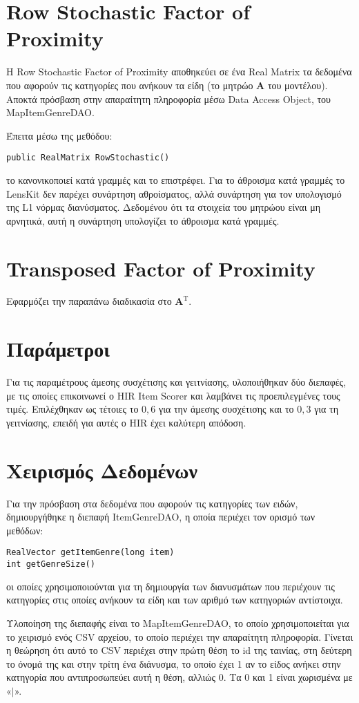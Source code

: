 \section{\en Row Stochastic Factor of Proximity}
\el Η {\en Row Stochastic Factor of Proximity} αποθηκεύει σε ένα {\en Real Matrix} τα δεδομένα που αφορούν τις κατηγορίες που ανήκουν τα είδη (το μητρώο $\mathbf{A}$ του μοντέλου). Αποκτά πρόσβαση στην απαραίτητη πληροφορία μέσω {\en Data Access Object}, του {\en MapItemGenreDAO}. \par
Έπειτα μέσω της μεθόδου:
\en \begin{verbatim}
public RealMatrix RowStochastic()
\end{verbatim}
\el το κανονικοποιεί κατά γραμμές και το επιστρέφει. Για το άθροισμα κατά γραμμές το {\en LensKit} δεν παρέχει συνάρτηση αθροίσματος, αλλά συνάρτηση για τον υπολογισμό της {\en L1} νόρμας διανύσματος. Δεδομένου ότι τα στοιχεία του μητρώου είναι μη αρνητικά, αυτή η συνάρτηση υπολογίζει το άθροισμα κατά γραμμές. 
\section{\en Transposed Factor of Proximity}
Εφαρμόζει την παραπάνω διαδικασία στο $\mathbf{A}^\text{T}$.
\section{Παράμετροι}
Για τις παραμέτρους άμεσης συσχέτισης και γειτνίασης, υλοποιήθηκαν δύο διεπαφές, με τις οποίες επικοινωνεί ο {\en HIR Item Scorer} και λαμβάνει τις προεπιλεγμένες τους τιμές. Επιλέχθηκαν ως τέτοιες το $0,6$ για την άμεσης συσχέτισης και το $0,3$ για τη γειτνίασης, επειδή για αυτές ο {\en HIR} έχει καλύτερη απόδοση. \cite{Nikolakopoulos2015126}
\section{Χειρισμός Δεδομένων}
Για την πρόσβαση στα δεδομένα που αφορούν τις κατηγορίες των ειδών, δημιουργήθηκε η διεπαφή {\en ItemGenreDAO}, η οποία περιέχει τον ορισμό των μεθόδων:
\en \begin{verbatim}
RealVector getItemGenre(long item)
int getGenreSize()
\end{verbatim}
\el οι οποίες χρησιμοποιούνται για τη δημιουργία των διανυσμάτων που περιέχουν τις κατηγορίες στις οποίες ανήκουν τα είδη και των αριθμό των κατηγοριών αντίστοιχα. \par
Υλοποίηση της διεπαφής είναι το {\en MapItemGenreDAO}, το οποίο χρησιμοποιείται για το χειρισμό ενός {\en CSV} αρχείου, το οποίο περιέχει την απαραίτητη πληροφορία. Γίνεται η θεώρηση ότι αυτό το {\en CSV} περιέχει στην πρώτη θέση το {id} της ταινίας, στη δεύτερη το όνομά της και στην τρίτη ένα διάνυσμα, το οποίο έχει 1 αν το είδος ανήκει στην κατηγορία που αντιπροσωπεύει αυτή η θέση, αλλιώς 0. Τα 0 και 1 είναι χωρισμένα με «$|$».
